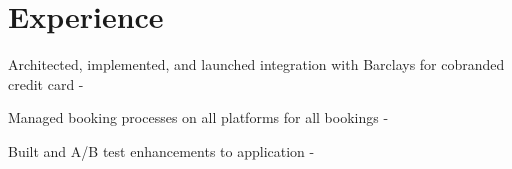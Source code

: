 \documentclass[]{plushcv}
\begin{document}
\begin{minipage}[t]{0.25\textwidth}
    
    
    \end{minipage} 
\hfill
\begin{minipage}[t]{0.7\textwidth} 


\section{Experience}
\vspace{\topsep} %
\begin{tightemize}
\sectionsep
\item Architected, implemented, and launched integration with Barclays for cobranded credit card \angular - \graphql\\
\item Managed booking processes on all platforms for all bookings \angular - \graphql \\
\item Built and A/B test enhancements to application \angular - \graphql \\
\end{tightemize}
\sectionsep



\end{minipage}
\end{document}

